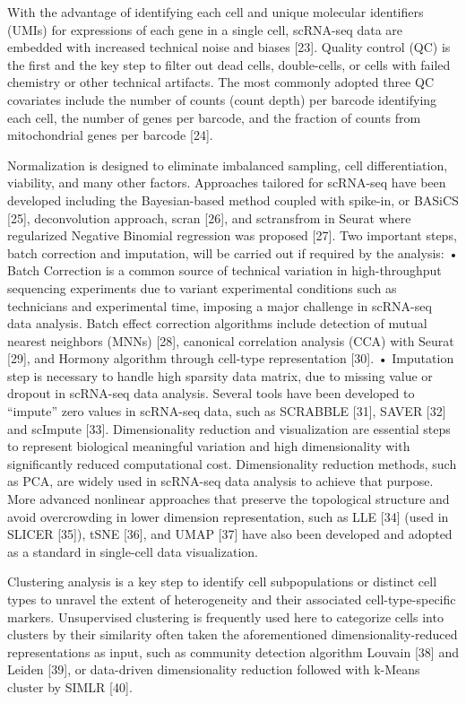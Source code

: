 \documentclass[
]{book}
\begin{document}
With the advantage of identifying each cell and unique molecular identifiers (UMIs) for expressions of each gene in a single cell, scRNA-seq data are embedded with increased technical noise and biases {[}23{]}. Quality control (QC) is the first and the key step to filter out dead cells, double-cells, or cells with failed chemistry or other technical artifacts. The most commonly adopted three QC covariates include the number of counts (count depth) per barcode identifying each cell, the number of genes per barcode, and the fraction of counts from mitochondrial genes per barcode {[}24{]}.

Normalization is designed to eliminate imbalanced sampling, cell differentiation, viability, and many other factors. Approaches tailored for scRNA-seq have been developed including the Bayesian-based method coupled with spike-in, or BASiCS {[}25{]}, deconvolution approach, scran {[}26{]}, and sctransfrom in Seurat where regularized Negative Binomial regression was proposed {[}27{]}. Two important steps, batch correction and imputation, will be carried out if required by the analysis:
• Batch Correction is a common source of technical variation in high-throughput sequencing experiments due to variant experimental conditions such as technicians and experimental time, imposing a major challenge in scRNA-seq data analysis. Batch effect correction algorithms include detection of mutual nearest neighbors (MNNs) {[}28{]}, canonical correlation analysis (CCA) with Seurat {[}29{]}, and Hormony algorithm through cell-type representation {[}30{]}.
• Imputation step is necessary to handle high sparsity data matrix, due to missing value or dropout in scRNA-seq data analysis. Several tools have been developed to ``impute'' zero values in scRNA-seq data, such as SCRABBLE {[}31{]}, SAVER {[}32{]} and scImpute {[}33{]}.
Dimensionality reduction and visualization are essential steps to represent biological meaningful variation and high dimensionality with significantly reduced computational cost. Dimensionality reduction methods, such as PCA, are widely used in scRNA-seq data analysis to achieve that purpose. More advanced nonlinear approaches that preserve the topological structure and avoid overcrowding in lower dimension representation, such as LLE {[}34{]} (used in SLICER {[}35{]}), tSNE {[}36{]}, and UMAP {[}37{]} have also been developed and adopted as a standard in single-cell data visualization.

Clustering analysis is a key step to identify cell subpopulations or distinct cell types to unravel the extent of heterogeneity and their associated cell-type-specific markers. Unsupervised clustering is frequently used here to categorize cells into clusters by their similarity often taken the aforementioned dimensionality-reduced representations as input, such as community detection algorithm Louvain {[}38{]} and Leiden {[}39{]}, or data-driven dimensionality reduction followed with k-Means cluster by SIMLR {[}40{]}.
\end{document}
